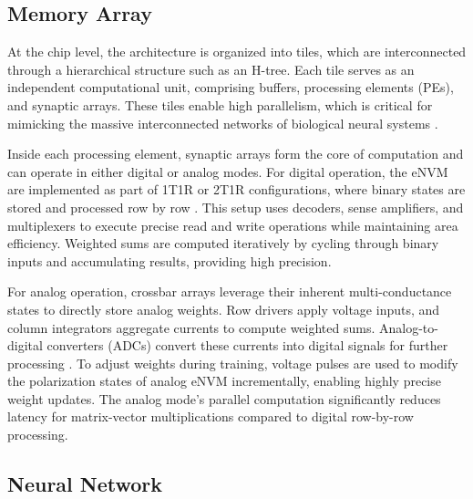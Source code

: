 \documentclass[conference]{IEEEtran}
\begin{document}
\subsection{Memory Array}
At the chip level, the architecture is organized into tiles, which are interconnected through a hierarchical structure such as an H-tree. Each tile serves as an independent computational unit, comprising buffers, processing elements (PEs), and synaptic arrays. These tiles enable high parallelism, which is critical for mimicking the massive interconnected networks of biological neural systems \cite{peng_dnnneurosim_2019}. 

Inside each processing element, synaptic arrays form the core of computation and can operate in either digital or analog modes. For digital operation, the eNVM are implemented as part of 1T1R or 2T1R configurations, where binary states are stored and processed row by row \cite{peng_dnnneurosim_2021}. This setup uses decoders, sense amplifiers, and multiplexers to execute precise read and write operations while maintaining area efficiency. Weighted sums are computed iteratively by cycling through binary inputs and accumulating results, providing high precision.

For analog operation, crossbar arrays leverage their inherent multi-conductance states to directly store analog weights. Row drivers apply voltage inputs, and column integrators aggregate currents to compute weighted sums. Analog-to-digital converters (ADCs) convert these currents into digital signals for further processing \cite{peng_dnnneurosim_2021}. To adjust weights during training, voltage pulses are used to modify the polarization states of analog eNVM incrementally, enabling highly precise weight updates. The analog mode's parallel computation significantly reduces latency for matrix-vector multiplications compared to digital row-by-row processing.

\subsection{Neural Network}
\end{document}
